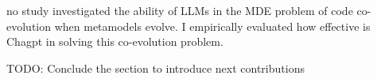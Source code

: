   no study investigated the ability of LLMs in the MDE problem of code co-evolution when metamodels evolve. I empirically evaluated how effective is Chagpt in solving this co-evolution problem.
  
  
  TODO: Conclude the section to introduce next contributions

  
  
  
  
  



